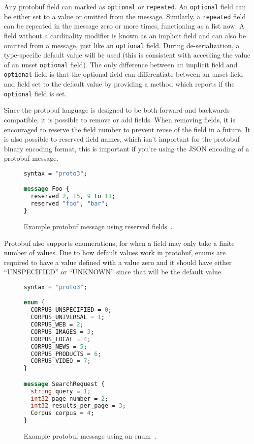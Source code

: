 \documentclass[11pt]{article}
\theoremstyle{definition}
\theoremstyle{plain}
\begin{document}
Any protobuf field can marked as \texttt{optional} or \texttt{repeated}. An
\texttt{optional} field can be either set to a value or omitted from the
message. Similarly, a \texttt{repeated} field can be repeated in the message
zero or more times, functioning as a list now. A field without a cardinality
modifier is known as an implicit field and can also be omitted from a message,
just like an \texttt{optional} field. During de-serialization, a type-specific
default value will be used (this is consistent with accessing the value of an
unset \texttt{optional} field). The only difference between an implicit field
and \texttt{optional} field is that the optional field can differentiate between
an unset field and field set to the default value by providing a method which
reports if the \texttt{optional} field is set.

Since the protobuf language is designed to be both forward and backwards
compatible, it is possible to remove or add fields. When removing fields, it is
encouraged to reserve the field number to prevent reuse of the field in a
future. It is also possible to reserved field names, which isn't important for
the protobuf binary encoding format, this is important if you're using the JSON
encoding of a protobuf message.

\begin{figure}[H]
	\begin{lstlisting}[language=proto]
syntax = "proto3";

message Foo {
  reserved 2, 15, 9 to 11;
  reserved "foo", "bar";
}\end{lstlisting}

	\caption{Example protobuf message using reserved fields~\cite{LanguageGuideProto}.}
	\label{fig:proto-reserved}
\end{figure}

Protobuf also supports enumerations, for when a field may only take a finite
number of values. Due to how default values work in protobuf, enums are required
to have a value defined with a value zero and it should have either
``UNSPECIFIED'' or ``UNKNOWN'' since that will be the default value.

\begin{figure}[H]
	\begin{lstlisting}[language=proto]
syntax = "proto3";

enum {
  CORPUS_UNSPECIFIED = 0;
  CORPUS_UNIVERSAL = 1;
  CORPUS_WEB = 2;
  CORPUS_IMAGES = 3;
  CORPUS_LOCAL = 4;
  CORPUS_NEWS = 5;
  CORPUS_PRODUCTS = 6;
  CORPUS_VIDEO = 7;
}

message SearchRequest {
  string query = 1;
  int32 page_number = 2;
  int32 results_per_page = 3;
  Corpus corpus = 4;
}\end{lstlisting}

	\caption{Example protobuf message using an enum~\cite{LanguageGuideProto}.}
	\label{fig:proto-enum}
\end{figure}
\end{document}
